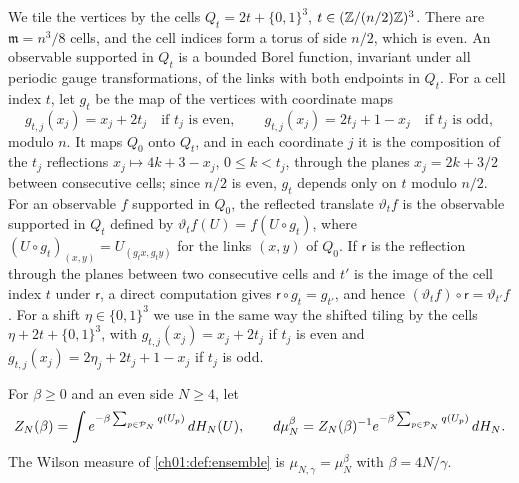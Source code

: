 We tile the vertices by the cells $Q_t=2t+\{0,1\}^3$, $t\in(\mathbb Z/(n/2)\mathbb Z)^3$. There are $\mathfrak m=n^3/8$ cells, and the cell indices form a torus of side $n/2$, which is even. An observable supported in $Q_t$ is a bounded Borel function, invariant under all periodic gauge transformations, of the links with both endpoints in $Q_t$. For a cell index $t$, let $g_t$ be the map of the vertices with coordinate maps
\[
 g_{t,j}(x_j)=x_j+2t_j\quad\text{if $t_j$ is even},\qquad g_{t,j}(x_j)=2t_j+1-x_j\quad\text{if $t_j$ is odd},
\]
modulo $n$. It maps $Q_0$ onto $Q_t$, and in each coordinate $j$ it is the composition of the $t_j$ reflections $x_j\mapsto4k+3-x_j$, $0\le k<t_j$, through the planes $x_j=2k+3/2$ between consecutive cells; since $n/2$ is even, $g_t$ depends only on $t$ modulo $n/2$. For an observable $f$ supported in $Q_0$, the reflected translate $\vartheta_tf$ is the observable supported in $Q_t$ defined by $\vartheta_tf(U)=f(U\circ g_t)$, where $(U\circ g_t)_{(x,y)}=U_{(g_tx,g_ty)}$ for the links $(x,y)$ of $Q_0$. If $\mathsf r$ is the reflection through the planes between two consecutive cells and $t'$ is the image of the cell index $t$ under $\mathsf r$, a direct computation gives $\mathsf r\circ g_t=g_{t'}$, and hence $(\vartheta_tf)\circ\mathsf r=\vartheta_{t'}f$. For a shift $\eta\in\{0,1\}^3$ we use in the same way the shifted tiling by the cells $\eta+2t+\{0,1\}^3$, with $g_{t,j}(x_j)=x_j+2t_j$ if $t_j$ is even and $g_{t,j}(x_j)=2\eta_j+2t_j+1-x_j$ if $t_j$ is odd.

For $\beta\ge0$ and an even side $N\ge4$, let
\[
 Z_N(\beta)=\int e^{-\beta\sum_{p\in\mathcal P_{N}}q(U_p)}\,dH_N(U),\qquad d\mu_N^\beta=Z_N(\beta)^{-1}e^{-\beta\sum_{p\in\mathcal P_{N}}q(U_p)}\,dH_N.
\]
The Wilson measure of \cref{ch01:def:ensemble} is $\mu_{N,\gamma}=\mu_N^{\beta}$ with $\beta=4N/\gamma$.

